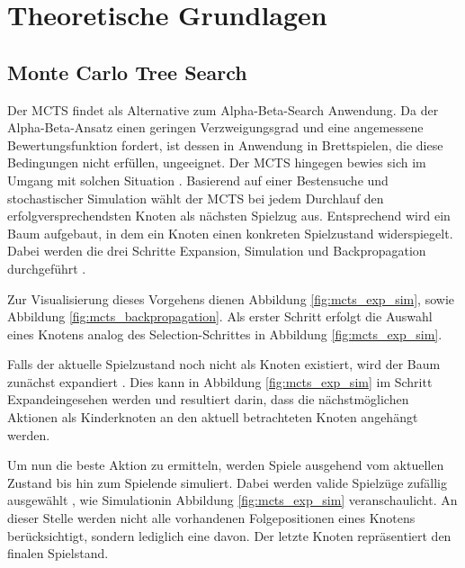 \documentclass[12pt,a4paper]{article}
\begin{document}
 


\newpage

\section{Theoretische Grundlagen}

\subsection{Monte Carlo Tree Search}
Der MCTS findet als Alternative zum Alpha-Beta-Search Anwendung. Da der Alpha-Beta-Ansatz einen geringen Verzweigungsgrad und eine angemessene Bewertungsfunktion fordert, ist dessen in Anwendung in Brettspielen, die diese Bedingungen nicht erfüllen, ungeeignet. Der MCTS hingegen bewies sich im Umgang mit solchen Situation \cite{Chaslot2008}.
Basierend auf einer Bestensuche und stochastischer Simulation  wählt der MCTS bei jedem Durchlauf den erfolgversprechendsten Knoten als nächsten Spielzug aus. Entsprechend wird ein Baum aufgebaut, in dem ein Knoten einen konkreten Spielzustand widerspiegelt\cite{Chaslot2008}. Dabei werden die drei Schritte Expansion, Simulation und Backpropagation durchgeführt \cite{Chaslot2008}.

Zur Visualisierung dieses Vorgehens dienen Abbildung \ref{fig:mcts_exp_sim}, sowie Abbildung \ref{fig:mcts_backpropagation}. 
Als erster Schritt erfolgt die Auswahl eines Knotens analog des \glqq{}Selection\grqq{}-Schrittes in Abbildung \ref{fig:mcts_exp_sim}.

Falls der aktuelle Spielzustand noch nicht als Knoten existiert, wird der Baum zunächst expandiert \cite{Chaslot2008}. Dies kann in Abbildung \ref{fig:mcts_exp_sim} im Schritt \glqq{}Expand\grqq eingesehen werden und resultiert darin, dass die nächstmöglichen Aktionen als Kinderknoten an den aktuell betrachteten Knoten angehängt werden.

Um nun die beste Aktion zu ermitteln, werden Spiele ausgehend vom aktuellen Zustand bis hin zum Spielende simuliert. Dabei werden valide Spielzüge zufällig ausgewählt \cite{Chaslot2008}, wie \glqq{}Simulation\grqq in Abbildung \ref{fig:mcts_exp_sim} veranschaulicht. An dieser Stelle werden nicht alle vorhandenen Folgepositionen eines Knotens berücksichtigt, sondern lediglich eine davon. Der letzte Knoten repräsentiert den finalen Spielstand.
\end{document}
